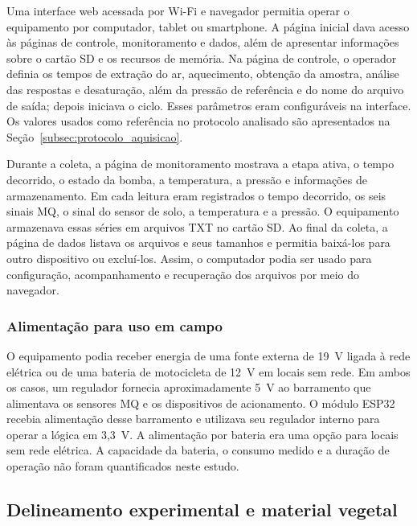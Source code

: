 Uma interface web acessada por Wi-Fi e navegador permitia operar o
equipamento por computador, tablet ou smartphone. A página inicial dava
acesso às páginas de controle, monitoramento e dados, além de apresentar
informações sobre o cartão SD e os recursos de memória. Na página de
controle, o operador definia os tempos de extração do ar, aquecimento,
obtenção da amostra, análise das respostas e desaturação, além da pressão
de referência e do nome do arquivo de saída; depois iniciava o ciclo.
Esses parâmetros eram configuráveis na interface. Os valores usados como
referência no protocolo analisado são apresentados na
Seção~\ref{subsec:protocolo_aquisicao}.

Durante a coleta, a página de monitoramento mostrava a etapa ativa, o
tempo decorrido, o estado da bomba, a temperatura, a pressão e informações
de armazenamento. Em cada leitura eram registrados o tempo decorrido, os
seis sinais MQ, o sinal do sensor de solo, a temperatura e a pressão.
O equipamento armazenava essas séries em arquivos TXT no cartão SD.
Ao final da coleta, a página de dados listava os arquivos e seus tamanhos
e permitia baixá-los para outro dispositivo ou excluí-los. Assim, o
computador podia ser usado para configuração, acompanhamento e recuperação
dos arquivos por meio do navegador.

\subsubsection{Alimentação para uso em campo}

O equipamento podia receber energia de uma fonte externa de 19~V ligada à
rede elétrica ou de uma bateria de motocicleta de 12~V em locais sem rede.
Em ambos os casos, um regulador fornecia aproximadamente 5~V ao barramento
que alimentava os sensores MQ e os dispositivos de acionamento. O módulo
ESP32 recebia alimentação desse barramento e utilizava seu regulador
interno para operar a lógica em 3,3~V. A alimentação por bateria era uma
opção para locais sem rede elétrica. A capacidade da bateria, o consumo
medido e a duração de operação não foram quantificados neste estudo.

\subsection{Delineamento experimental e material vegetal}
\label{subsec:delineamento}

